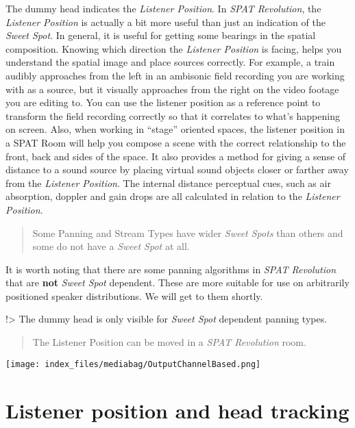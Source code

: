 \documentclass[
  letterpaper,
  DIV=11,
  numbers=noendperiod]{scrreport}
\begin{document}
The dummy head indicates the \emph{Listener Position}. In \emph{SPAT
Revolution}, the \emph{Listener Position} is actually a bit more useful
than just an indication of the \emph{Sweet Spot}. In general, it is
useful for getting some bearings in the spatial composition. Knowing
which direction the \emph{Listener Position} is facing, helps you
understand the spatial image and place sources correctly. For example, a
train audibly approaches from the left in an ambisonic field recording
you are working with as a source, but it visually approaches from the
right on the video footage you are editing to. You can use the listener
position as a reference point to transform the field recording correctly
so that it correlates to what's happening on screen. Also, when working
in ``stage'' oriented spaces, the listener position in a SPAT Room will
help you compose a scene with the correct relationship to the front,
back and sides of the space. It also provides a method for giving a
sense of distance to a sound source by placing virtual sound objects
closer or farther away from the \emph{Listener Position}. The internal
distance perceptual cues, such as air absorption, doppler and gain drops
are all calculated in relation to the \emph{Listener Position}.

\begin{quote}
Some Panning and Stream Types have wider \emph{Sweet Spots} than others
and some do not have a \emph{Sweet Spot} at all.
\end{quote}

It is worth noting that there are some panning algorithms in \emph{SPAT
Revolution} that are \textbf{not} \emph{Sweet Spot} dependent. These are
more suitable for use on arbitrarily positioned speaker distributions.
We will get to them shortly.

!\textgreater{} The dummy head is only visible for \emph{Sweet Spot}
dependent panning types.

\begin{quote}
The Listener Position can be moved in a \emph{SPAT Revolution} room.
\end{quote}

\texttt{[image: index\_files/mediabag/OutputChannelBased.png]}

\hypertarget{listener-position-and-head-tracking}{%
\section{Listener position and head
tracking}\label{listener-position-and-head-tracking}}
\end{document}
